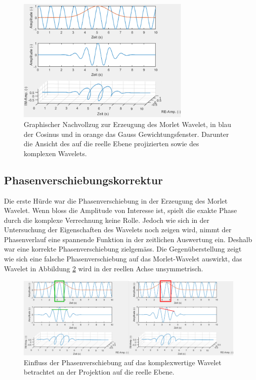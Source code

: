 \begin{figure}
	\centering
	\includegraphics[width=0.75\textwidth]{papers/wavelets/images/7_MorletWavelet.png}
	\caption{Graphischer Nachvollzug zur Erzeugung des Morlet Wavelet, in blau der Cosinus und in orange das Gauss Gewichtungsfenster. Darunter die Ansicht des auf die reelle Ebene projizierten sowie des komplexen Wavelets.}
	\label{wavelet:fig:MorletWavelet}
\end{figure}

\subsection{Phasenverschiebungskorrektur
	\label{wavelets:subsection:Phasenverschiebung}}
Die erste Hürde war die Phasenverschiebung in der Erzeugung des Morlet Wavelet. Wenn bloss die Amplitude von Interesse ist, spielt die exakte Phase durch die komplexe Verrechnung keine Rolle. Jedoch wie sich in der Untersuchung der Eigenschaften des Wavelets noch zeigen wird, nimmt der Phasenverlauf eine spannende Funktion in der zeitlichen Auswertung ein. Deshalb war eine korrekte Phasenverschiebung zielgemäss. Die Gegenüberstellung zeigt wie sich eine falsche Phasenverschiebung auf das Morlet-Wavelet auswirkt, das Wavelet in Abbildung \ref{wavelet:fig:PhaseShiftFailVsCor} wird in der reellen Achse unsymmetrisch.

\begin{figure}
	\centering
	\includegraphics[width=\textwidth]{papers/wavelets/images/9_PhaseShiftFailVsCor.png}
	\caption{Einfluss der Phasenverschiebung auf das komplexwertige Wavelet betrachtet an der Projektion auf die reelle Ebene.}
	\label{wavelet:fig:PhaseShiftFailVsCor}
\end{figure}

